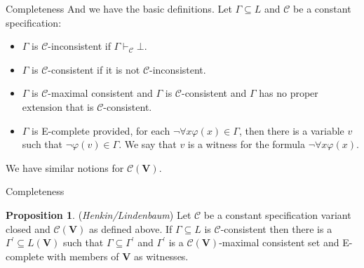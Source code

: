 \documentclass{beamer}
\theoremstyle{definition}
\newtheorem{pro}{Proposition}
\newcommand{\C}{\mathcal{C}}
\newcommand{\p}{^{\prime}}
\newcommand{\nao}{\neg}
\newcommand{\todo}{\forall}
\newcommand{\teo}{\vdash}
\begin{document}
	
	
\begin{frame}{Completeness}
\qquad And we have the basic definitions. Let $\Gamma \subseteq L$ and $\C$ be a constant specification:

\begin{itemize}
\item $\Gamma$ is $\C$-inconsistent if $\Gamma \teo_{\C} \bot$.
\item $\Gamma$ is $\C$-consistent if it is not $\C$-inconsistent.
\item $\Gamma$ is $\C$-maximal consistent and $\Gamma$ is $\C$-consistent and $\Gamma$ has no proper extension that is $\C$-consistent.
\item $\Gamma$ is E-complete provided, for each $\nao \todo x \varphi(x) \in \Gamma$, then there is a variable $v$ such that $\nao \varphi(v) \in \Gamma$. We say that $v$ is a witness for the formula $\nao \todo x \varphi(x)$.
\end{itemize}

\qquad We have similar notions for $\C(\textbf{V})$.\\
 
\end{frame}

\begin{frame}{Completeness}
\begin{pro}
	(\textit{Henkin/Lindenbaum}) Let $\C$ be a constant specification variant closed and $\C(\textbf{V})$ as defined above. If $\Gamma \subseteq L$ is $\C$-consistent then there is a $\Gamma\p \subseteq L(\textbf{V})$ such that $\Gamma \subseteq \Gamma\p$ and $\Gamma\p$ is a $\C(\textbf{V})$-maximal consistent set and E-complete with members of \textbf{V} as witnesses.    
\end{pro}
\end{frame}	
\end{document}
